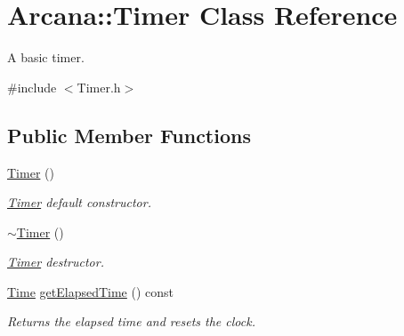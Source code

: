 \hypertarget{class_arcana_1_1_timer}{}\section{Arcana\+:\+:Timer Class Reference}
\label{class_arcana_1_1_timer}


A basic timer.  




{\ttfamily \#include $<$Timer.\+h$>$}

\subsection*{Public Member Functions}
\begin{DoxyCompactItemize}
\item 
\mbox{\label{class_arcana_1_1_timer_aed21eb672be57fe13d9cc217be0eab38}} 
\mbox{\hyperlink{class_arcana_1_1_timer_aed21eb672be57fe13d9cc217be0eab38}{Timer}} ()
\begin{DoxyCompactList}\small\item\em \mbox{\hyperlink{class_arcana_1_1_timer}{Timer}} default constructor. \end{DoxyCompactList}\item 
\mbox{\label{class_arcana_1_1_timer_a2dc493f25fd19b33c81223ff0c8187a9}} 
\mbox{\hyperlink{class_arcana_1_1_timer_a2dc493f25fd19b33c81223ff0c8187a9}{$\sim$\+Timer}} ()
\begin{DoxyCompactList}\small\item\em \mbox{\hyperlink{class_arcana_1_1_timer}{Timer}} destructor. \end{DoxyCompactList}\item 
\mbox{\label{class_arcana_1_1_timer_a7c994a4b608c1585fbb0cc38cea0bcf5}} 
\mbox{\hyperlink{class_arcana_1_1_time}{Time}} \mbox{\hyperlink{class_arcana_1_1_timer_a7c994a4b608c1585fbb0cc38cea0bcf5}{get\+Elapsed\+Time}} () const
\begin{DoxyCompactList}\small\item\em Returns the elapsed time and resets the clock. \end{DoxyCompactList}\item 
\mbox{\label{class_arcana_1_1_timer_a35fb2548a0d576c5265da9093c0f18ef}} 

\end{DoxyCompactItemize}
